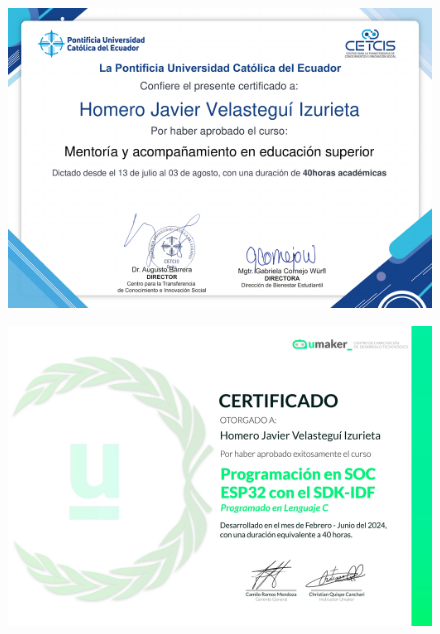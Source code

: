 \FloatBarrier
\begin{figure}[ht]
    \setlength{\parindent}{-20pt}
    \includegraphics[width=\textwidth]{2.-Estudios/Certificados/23.pdf}
\end{figure}

\begin{figure}[ht]
    \setlength{\parindent}{-20pt}
    \includegraphics[width=\textwidth]{2.-Estudios/Certificados/22.pdf}
\end{figure}

